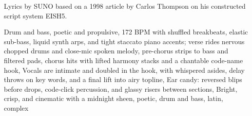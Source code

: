 
\begin{notes}
Lyrics by SUNO based on a 1998 article by Carlos Thompson on his constructed script system EISH5.
\end{notes}
\begin{style}
Drum and bass, poetic and propulsive, 172 BPM with shuffled breakbeats, elastic sub-bass, liquid synth arps, and tight staccato piano accents; verse rides nervous chopped drums and close-mic spoken melody, pre-chorus strips to bass and filtered pads, chorus hits with lifted harmony stacks and a chantable code-name hook, Vocals are intimate and doubled in the hook, with whispered asides, delay throws on key words, and a final lift into airy topline, Ear candy: reversed blips before drops, code-click percussion, and glassy risers between sections, Bright, crisp, and cinematic with a midnight sheen, poetic, drum and bass, latin, complex
\end{style}
